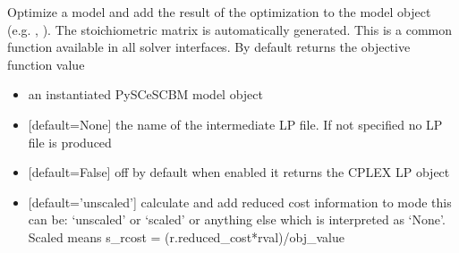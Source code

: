 \documentclass[letterpaper,10pt,english]{sphinxmanual}
\begin{document}
\begin{fulllineitems}
\label{\detokenize{modules_doc:cbmpy.CBCPLEX.cplx_analyzeModel}}
\pysigstartsignatures
{}
\pysigstopsignatures
\sphinxAtStartPar
Optimize a model and add the result of the optimization to the model object
(e.g. , ). The stoichiometric
matrix is automatically generated. This is a common function available
in all solver interfaces. By default returns the objective function value
\begin{itemize}
\item {} 
\sphinxAtStartPar
{} an instantiated PySCeSCBM model object

\item {} 
\sphinxAtStartPar
{} {[}default=None{]} the name of the intermediate LP file. If not specified no LP file is produced

\item {} 
\sphinxAtStartPar
{} {[}default=False{]} off by default when enabled it returns the CPLEX LP object

\item {} 
\sphinxAtStartPar
{} {[}default=’unscaled’{]} calculate and add reduced cost information to mode this can be: ‘unscaled’ or ‘scaled’
or anything else which is interpreted as ‘None’. Scaled means s\_rcost = (r.reduced\_cost*rval)/obj\_value


\end{itemize}
\end{fulllineitems}
\end{document}
